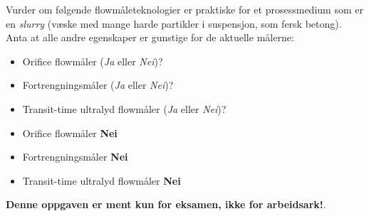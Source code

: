 

Vurder om følgende flowmåleteknologier er praktiske for et prosessmedium som er en {\it slurry} (væske med mange harde partikler i suspensjon, som fersk betong). Anta at alle andre egenskaper er gunstige for de aktuelle målerne:

\begin{itemize}
\item{} Orifice flowmåler ({\it Ja} eller {\it Nei})?
\vskip 10pt
\item{} Fortrengningsmåler ({\it Ja} eller {\it Nei})?
\vskip 10pt
\item{} Transit-time ultralyd flowmåler ({\it Ja} eller {\it Nei})?
\end{itemize}







\begin{itemize}
\item{} Orifice flowmåler {\bf Nei}
\item{} Fortrengningsmåler {\bf Nei}
\item{} Transit-time ultralyd flowmåler {\bf Nei}
\end{itemize}







{\bf Denne oppgaven er ment kun for eksamen, ikke for arbeidsark!}.


